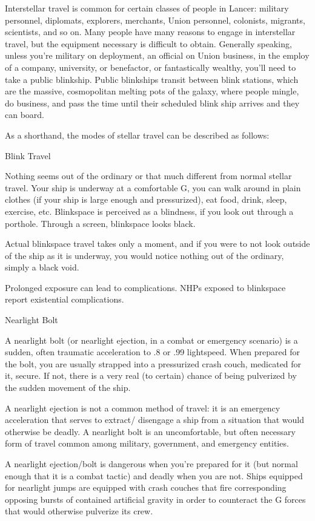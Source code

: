 Interstellar travel is common for certain classes of people in Lancer: military personnel,
diplomats, explorers, merchants, Union personnel, colonists, migrants, scientists, and so on.
Many people have many reasons to engage in interstellar travel, but the equipment necessary is
difficult to obtain. Generally speaking, unless you’re military on deployment, an official on Union
business, in the employ of a company, university, or benefactor, or fantastically wealthy, you’ll
need to take a public blinkship. Public blinkships transit between blink stations, which are the
massive, cosmopolitan melting pots of the galaxy, where people mingle, do business, and pass
the time until their scheduled blink ship arrives and they can board.


As a shorthand, the modes of stellar travel can be described as follows:


Blink Travel


Nothing seems out of the ordinary or that much different from normal stellar travel. Your ship is
underway at a comfortable G, you can walk around in plain clothes (if your ship is large enough
and pressurized), eat food, drink, sleep, exercise, etc. Blinkspace is perceived as a blindness, if
you look out through a porthole. Through a screen, blinkspace looks black.


Actual blinkspace travel takes only a moment, and if you were to not look outside of the ship as it
is underway, you would notice nothing out of the ordinary, simply a black void.


Prolonged exposure can lead to complications. NHPs exposed to blinkspace report existential
complications.


Nearlight Bolt

A nearlight bolt (or nearlight ejection, in a combat or emergency scenario) is a sudden, often
traumatic acceleration to .8 or .99 lightspeed. When prepared for the bolt, you are usually
strapped into a pressurized crash couch, medicated for it, secure. If not, there is a very real (to
certain) chance of being pulverized by the sudden movement of the ship.


A nearlight ejection is not a common method of travel: it is an emergency acceleration that
serves to extract/ disengage a ship from a situation that would otherwise be deadly. A nearlight
bolt is an uncomfortable, but often necessary form of travel common among military,
government, and emergency entities.


A nearlight ejection/bolt is dangerous when you’re prepared for it (but normal enough that it is a
combat tactic) and deadly when you are not. Ships equipped for nearlight jumps are equipped
with crash couches that fire corresponding opposing bursts of contained artificial gravity in order
to counteract the G forces that would otherwise pulverize its crew.


